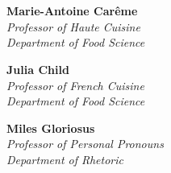 \section*{}
\begin{flushright}

 \textbf{Marie-Antoine Carême} \\ %
 {\itshape
   Professor of Haute Cuisine \\
   Department of Food Science \\[18pt]
 }

 \textbf{Julia Child} \\ %
 {\itshape
   Professor of French Cuisine \\
   Department of Food Science \\[18pt]
 }

 \textbf{Miles Gloriosus} \\ %
 {\itshape
   Professor of Personal Pronouns \\
   Department of Rhetoric \\
 }

\end{flushright}
